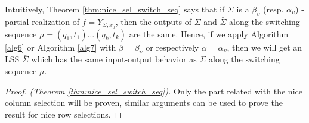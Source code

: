 \documentclass[journal]{IEEEtran}
\begin{document}
Intuitively, Theorem \ref{thm:nice_sel_switch_seq} says that if $\bar{\Sigma}$ is a $\beta_\upsilon$ (resp. $\alpha_\upsilon$) - partial realization of $f=Y_{\Sigma,x_0}$, then the outputs of $\Sigma$ and $\bar{\Sigma}$ along the switching sequence $\mu=(q_1,t_1) \dots (q_k,t_k)$ are the same. Hence, if we apply Algorithm \ref{alg6} or Algorithm \ref{alg7} with $\beta=\beta_\upsilon$ or respectively $\alpha=\alpha_\upsilon$, then we will get an LSS $\bar{\Sigma}$ which has the same input-output behavior as $\Sigma$ along the switching sequence $\mu$.

\begin{proof}\emph{(Theorem \ref{thm:nice_sel_switch_seq}).}
	Only the part related with the nice column selection will be proven, similar arguments can be used to prove the result for
	nice row selections.
	

\end{proof}
\end{document}
